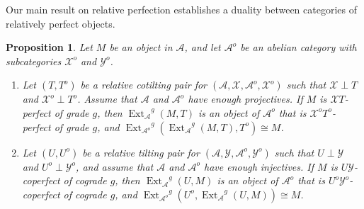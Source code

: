 \documentclass{amsart}
\newtheorem{prop}[lem]{Proposition}
\begin{document}
Our main result on relative perfection establishes a duality between 
categories of relatively perfect objects.

\begin{prop} \label{perfect1}
Let $M$ be an object in ${{\mathcal{{A}}}}$,
and let ${{{\mathcal{{A}}}}^o}$ be an abelian category with subcategories ${{{\mathcal{{X}}}}^o}$ and ${{{\mathcal{{Y}}}}^o}$.
\begin{enumerate}[\quad\rm(a)]
\item \label{perfect1item1}
Let $(T,T^o)$ be a relative cotilting pair for $({{\mathcal{{A}}}},{{\mathcal{{X}}}},{{{\mathcal{{A}}}}^o},{{{\mathcal{{X}}}}^o})$ such that
${{\mathcal{{X}}}}\perp T$ and ${{{\mathcal{{X}}}}^o}\perp T^o$.  Assume that ${{\mathcal{{A}}}}$ and ${{{\mathcal{{A}}}}^o}$ have
enough projectives.  If $M$ is ${{\mathcal{{X}}}} T$-perfect of grade $g$, then 
${{\operatorname{Ext}}_{{\mathcal{{A}}}}}^g(M,T)$ is an object of ${{{\mathcal{{A}}}}^o}$ that is ${{{\mathcal{{X}}}}^o} T^o$-perfect of
grade $g$, and 
${{\operatorname{Ext}}_{{{\mathcal{{A}}}}^o}}^g({{\operatorname{Ext}}_{{\mathcal{{A}}}}}^g(M,T),T^o)\cong M$.
\item \label{perfect1item2}
Let $(U,U^o)$ be a relative tilting pair for $({{\mathcal{{A}}}},{{\mathcal{{Y}}}},{{{\mathcal{{A}}}}^o},{{{\mathcal{{Y}}}}^o})$ such that
$U\perp {{\mathcal{{Y}}}}$ and $U^o\perp {{{\mathcal{{Y}}}}^o}$, and assume that ${{\mathcal{{A}}}}$ and ${{{\mathcal{{A}}}}^o}$ have
enough injectives.  If $M$ is $U{{\mathcal{{Y}}}}$-coperfect of cograde $g$, then 
${{\operatorname{Ext}}_{{\mathcal{{A}}}}}^g(U,M)$ is an object of ${{{\mathcal{{A}}}}^o}$ that is $U^o{{{\mathcal{{Y}}}}^o}$-coperfect of
cograde $g$, and ${{\operatorname{Ext}}_{{{\mathcal{{A}}}}^o}}^g(U^o,{{\operatorname{Ext}}_{{\mathcal{{A}}}}}^g(U,M))\cong M$.
\end{enumerate}
\end{prop}
\end{document}
